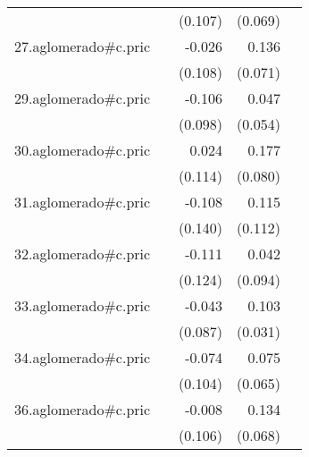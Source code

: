 {\begin{longtable}{l*{4}{D{.}{.}{-1}}}
            &                     &     (0.107)         &     (0.069)         &                     \\
\addlinespace
27.aglomerado#c.pric&                     &      -0.026         &       0.136         &                     \\
            &                     &     (0.108)         &     (0.071)         &                     \\
\addlinespace
29.aglomerado#c.pric&                     &      -0.106         &       0.047         &                     \\
            &                     &     (0.098)         &     (0.054)         &                     \\
\addlinespace
30.aglomerado#c.pric&                     &       0.024         &       0.177\sym{*}  &                     \\
            &                     &     (0.114)         &     (0.080)         &                     \\
\addlinespace
31.aglomerado#c.pric&                     &      -0.108         &       0.115         &                     \\
            &                     &     (0.140)         &     (0.112)         &                     \\
\addlinespace
32.aglomerado#c.pric&                     &      -0.111         &       0.042         &                     \\
            &                     &     (0.124)         &     (0.094)         &                     \\
\addlinespace
33.aglomerado#c.pric&                     &      -0.043         &       0.103\sym{***}&                     \\
            &                     &     (0.087)         &     (0.031)         &                     \\
\addlinespace
34.aglomerado#c.pric&                     &      -0.074         &       0.075         &                     \\
            &                     &     (0.104)         &     (0.065)         &                     \\
\addlinespace
36.aglomerado#c.pric&                     &      -0.008         &       0.134\sym{*}  &                     \\
            &                     &     (0.106)         &     (0.068)         &                     \\

\end{longtable}}

